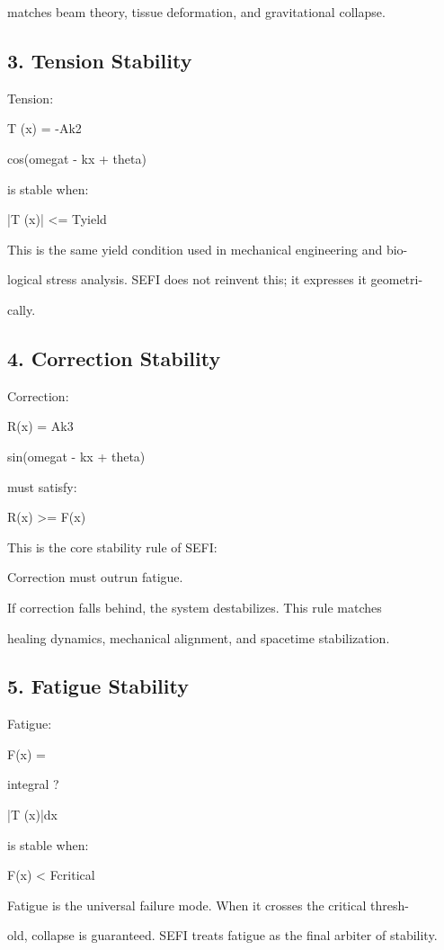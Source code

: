 \documentclass[10pt]{article}
\begin{document}
matches beam theory, tissue deformation, and gravitational collapse.

\subsection*{3. Tension Stability}
Tension:

T (x) = -Ak2

cos(omegat - kx + theta)


is stable when:

|T (x)| <= Tyield

This is the same yield condition used in mechanical engineering and bio-

logical stress analysis. SEFI does not reinvent this; it expresses it geometri-

cally.

\subsection*{4. Correction Stability}
Correction:

R(x) = Ak3

sin(omegat - kx + theta)

must satisfy:

R(x) >= F(x)

This is the core stability rule of SEFI:

Correction must outrun fatigue.

If correction falls behind, the system destabilizes. This rule matches

healing dynamics, mechanical alignment, and spacetime stabilization.

\subsection*{5. Fatigue Stability}
Fatigue:

F(x) =

integral ?

|T (x)|dx

is stable when:

F(x) < Fcritical

Fatigue is the universal failure mode. When it crosses the critical thresh-

old, collapse is guaranteed. SEFI treats fatigue as the final arbiter of stability.


\end{document}
